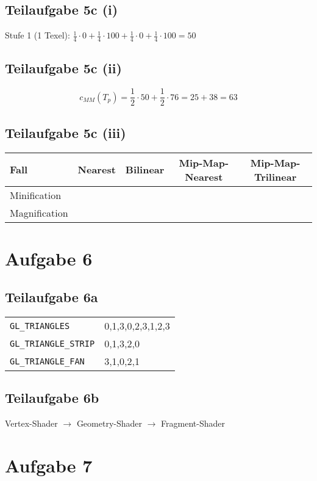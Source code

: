 \documentclass[a4paper]{scrartcl}
\begin{document}
\subsection*{Teilaufgabe 5c (i)}
Stufe 1 (1 Texel): $\frac{1}{4} \cdot 0 + \frac{1}{4} \cdot 100 + \frac{1}{4} \cdot 0 + \frac{1}{4} \cdot 100 = 50$

\subsection*{Teilaufgabe 5c (ii)}
\[c_{MM}(T_p) = \frac{1}{2} \cdot 50 + \frac{1}{2} \cdot 76 = 25 + 38 = 63\]

\subsection*{Teilaufgabe 5c (iii)}
\begin{tabular}{lcccc}\toprule
	\textbf{Fall} & \textbf{Nearest} & \textbf{Bilinear} & \textbf{Mip-Map-Nearest} & \textbf{Mip-Map-Trilinear} \\\midrule
	Minification  & \Square          & \Square           & \Square                  & \CheckedBox                \\
	Magnification & \Square          & \CheckedBox       & \Square                  & \Square                    \\\bottomrule
\end{tabular}

\section*{Aufgabe 6}
\subsection*{Teilaufgabe 6a}
\begin{tabular}{ll}
	\verb|GL_TRIANGLES|      & 0,1,3,0,2,3,1,2,3 \\
	\verb|GL_TRIANGLE_STRIP| & 0,1,3,2,0         \\
	\verb|GL_TRIANGLE_FAN|   & 3,1,0,2,1         \\
\end{tabular}

\subsection*{Teilaufgabe 6b}
Vertex-Shader $\rightarrow$ Geometry-Shader $\rightarrow$ Fragment-Shader

\section*{Aufgabe 7}
\end{document}
